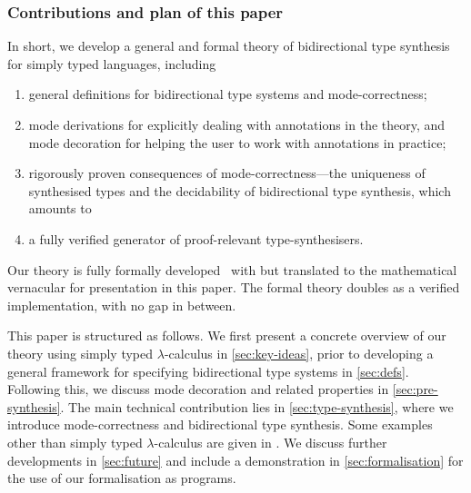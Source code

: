 \subsubsection{Contributions and plan of this paper}

%
In short, we develop a general and formal theory of bidirectional type synthesis for simply typed languages, including 
\begin{enumerate}
  \item general definitions for bidirectional type systems and mode-correctness;
  \item mode derivations for explicitly dealing with annotations in the theory, and mode decoration for helping the user to work with annotations in practice;
  \item rigorously proven consequences of mode-correctness---the uniqueness of synthesised types and the decidability of bidirectional type synthesis, which amounts to
  \item a fully verified generator of proof-relevant type-synthesisers.
\end{enumerate}
Our theory is fully formally developed~\cite{Chen2024a} with \Agda but translated to the mathematical vernacular for presentation in this paper.
The formal theory doubles as a verified implementation, with no gap in between.


This paper is structured as follows.
We first present a concrete overview of our theory using simply typed $\lambda$-calculus in \cref{sec:key-ideas}, prior to developing a general framework for specifying bidirectional type systems in \cref{sec:defs}.
Following this, we discuss mode decoration and related properties in \cref{sec:pre-synthesis}.
The main technical contribution lies in \cref{sec:type-synthesis}, where we introduce mode-correctness and bidirectional type synthesis.
Some examples other than simply typed $\lambda$-calculus are given in .
We discuss further developments in \cref{sec:future} and include a demonstration in \cref{sec:formalisation} for the use of our \Agda formalisation as programs.
